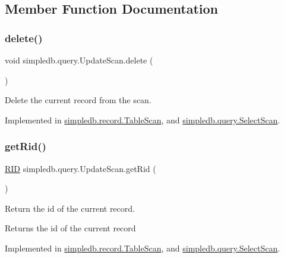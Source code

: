 \subsection{Member Function Documentation}
\mbox{\label{interfacesimpledb_1_1query_1_1UpdateScan_a503723e6287a2ea9ce73375f70a5e819}} 
\subsubsection{\texorpdfstring{delete()}{delete()}}
{\footnotesize\ttfamily void simpledb.\+query.\+Update\+Scan.\+delete (\begin{DoxyParamCaption}{ }\end{DoxyParamCaption})}

Delete the current record from the scan. 

Implemented in \hyperlink{classsimpledb_1_1record_1_1TableScan_a6797bdf6cdf1cd9f73cb86b32ac339d7}{simpledb.\+record.\+Table\+Scan}, and \hyperlink{classsimpledb_1_1query_1_1SelectScan_a698afd872a1362c6d20e59396adf64bb}{simpledb.\+query.\+Select\+Scan}.

\mbox{\label{interfacesimpledb_1_1query_1_1UpdateScan_aa98f38fa6d4fc66862e0c739b577ce2d}} 
\subsubsection{\texorpdfstring{get\+Rid()}{getRid()}}
{\footnotesize\ttfamily \hyperlink{classsimpledb_1_1record_1_1RID}{R\+ID} simpledb.\+query.\+Update\+Scan.\+get\+Rid (\begin{DoxyParamCaption}{ }\end{DoxyParamCaption})}

Return the id of the current record. \begin{DoxyReturn}{Returns}
the id of the current record 
\end{DoxyReturn}


Implemented in \hyperlink{classsimpledb_1_1record_1_1TableScan_ae04ff0088830ea94e2af70bdbb398a80}{simpledb.\+record.\+Table\+Scan}, and \hyperlink{classsimpledb_1_1query_1_1SelectScan_aa7c6dfd2ab2cd1846c4fa84ee2c455d5}{simpledb.\+query.\+Select\+Scan}.

